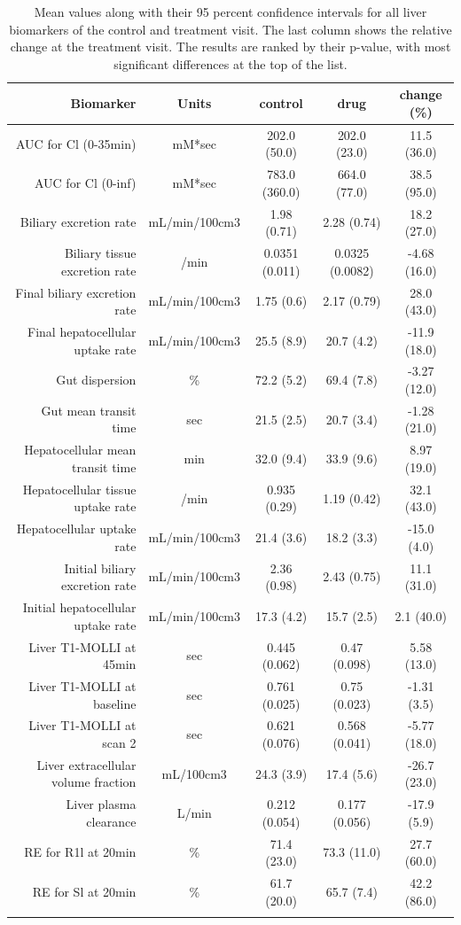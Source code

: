 \documentclass{epflreport}%
\begin{document}
\begin{longtable}{rcccc}%
\hline%
Biomarker&Units&control&drug&change (\%)\\%
\hline%
AUC for Cl (0{-}35min)&mM*sec&202.0 (50.0) &202.0 (23.0) &11.5 (36.0) \\%
AUC for Cl (0{-}inf)&mM*sec&783.0 (360.0) &664.0 (77.0) &38.5 (95.0) \\%
Biliary excretion rate&mL/min/100cm3&1.98 (0.71) &2.28 (0.74) &18.2 (27.0) \\%
Biliary tissue excretion rate&/min&0.0351 (0.011) &0.0325 (0.0082) &{-}4.68 (16.0) \\%
Final biliary excretion rate&mL/min/100cm3&1.75 (0.6) &2.17 (0.79) &28.0 (43.0) \\%
Final hepatocellular uptake rate&mL/min/100cm3&25.5 (8.9) &20.7 (4.2) &{-}11.9 (18.0) \\%
Gut dispersion&\%&72.2 (5.2) &69.4 (7.8) &{-}3.27 (12.0) \\%
Gut mean transit time&sec&21.5 (2.5) &20.7 (3.4) &{-}1.28 (21.0) \\%
Hepatocellular mean transit time&min&32.0 (9.4) &33.9 (9.6) &8.97 (19.0) \\%
Hepatocellular tissue uptake rate&/min&0.935 (0.29) &1.19 (0.42) &32.1 (43.0) \\%
Hepatocellular uptake rate&mL/min/100cm3&21.4 (3.6) &18.2 (3.3) &{-}15.0 (4.0) \\%
Initial biliary excretion rate&mL/min/100cm3&2.36 (0.98) &2.43 (0.75) &11.1 (31.0) \\%
Initial hepatocellular uptake rate&mL/min/100cm3&17.3 (4.2) &15.7 (2.5) &2.1 (40.0) \\%
Liver T1{-}MOLLI at 45min&sec&0.445 (0.062) &0.47 (0.098) &5.58 (13.0) \\%
Liver T1{-}MOLLI at baseline&sec&0.761 (0.025) &0.75 (0.023) &{-}1.31 (3.5) \\%
Liver T1{-}MOLLI at scan 2&sec&0.621 (0.076) &0.568 (0.041) &{-}5.77 (18.0) \\%
Liver extracellular volume fraction&mL/100cm3&24.3 (3.9) &17.4 (5.6) &{-}26.7 (23.0) \\%
Liver plasma clearance&L/min&0.212 (0.054) &0.177 (0.056) &{-}17.9 (5.9) \\%
RE for R1l at 20min&\%&71.4 (23.0) &73.3 (11.0) &27.7 (60.0) \\%
RE for Sl at 20min&\%&61.7 (20.0) &65.7 (7.4) &42.2 (86.0) \\%
\hline%
\caption{Mean values along with their 95 percent confidence intervals for all liver biomarkers of the control and treatment visit. The last column shows the relative change at the treatment visit. The results are ranked by their p-value, with most significant differences at the top of the list.} \\%
\end{longtable}%
\clearpage%
\end{document}
